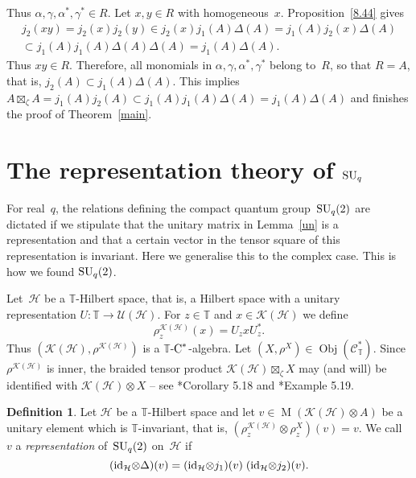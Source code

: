 \documentclass[a4paper]{amsart}
\numberwithin{equation}{section}
\theoremstyle{definition}
\newtheorem{Def}[Thm]{Definition}
\theoremstyle{remark}
\begin{document}
Thus $\alpha,\gamma,\alpha^{*},\gamma^{*}\in R$.  Let $x,y\in R$ with
homogeneous~\(x\).  Proposition~\ref{8.44} gives
\begin{multline*}
  j_{2}(xy)
  = j_{2}(x)j_{2}(y)\in j_{2}(x)j_{1}({{A}})\Delta({{A}})
  = j_{1}({{A}}) j_{2}(x) \Delta({{A}})
  \\ \subset j_{1}({{A}}) j_{1}({{A}}) \Delta({{A}})
  \Delta({{A}})
  = j_{1}({{A}})\Delta({{A}}).
\end{multline*}
Thus $xy\in R$.  Therefore, all monomials in
$\alpha,\gamma,\alpha^{*},\gamma^{*}$ belong to~$R$, so that
$R={{A}}$, that is, $j_{2}({{A}})\subset j_{1}({{A}})
\Delta({{A}})$.  This implies ${{A}}{\boxtimes}_\zeta {{A}} =
j_{1}({{A}}) j_{2}({{A}}) \subset j_{1}({{A}})
j_{1}({{A}}) \Delta({{A}}) = j_{1}({{A}}) \Delta({{A}})$
and finishes the proof of Theorem~\ref{main}.

\section{The representation theory of
  \texorpdfstring{${\textup{SU}}_{q}$}{SUq(2)}}

For real~\(q\), the relations defining the compact quantum
group~\({\textup{SU}}_q(2)\) are dictated if we stipulate that the unitary
matrix in Lemma~\ref{un} is a representation and that a certain vector
in the tensor square of this representation is invariant.  Here we
generalise this to the complex case.  This is how we found ${\textup{SU}}_q(2)$.

Let~$\mathcal{H}$ be a $\mathbb{T}${\nobreakdash}-Hilbert space, that is, a
Hilbert space with a unitary representation $U\colon
\mathbb{T}\rightarrow\mathcal{U}(\mathcal{H})$.  For $z\in\mathbb{T}$
and $x\in\mathcal{K}(\mathcal{H})$ we define
\[
\rho^{\mathcal{K}(\mathcal{H})}_z(x) = U_z xU_z^*.
\]
Thus $(\mathcal{K}(\mathcal{H}),\rho^{\mathcal{K}(\mathcal{H})})$ is a
\(\mathbb{T}\){\nobreakdash}-\({\textup{C}^*}\)-algebra.  Let
$(X,\rho^X)\in\operatorname{\mathrm{Obj}}(\mathcal{C}^*_{\mathbb{T}})$.  Since
$\rho^{\mathcal{K}(\mathcal{H})}$ is inner, the braided tensor product
$\mathcal{K}(\mathcal{H}){\boxtimes}_\zeta X$ may (and will) be identified
with $\mathcal{K}(\mathcal{H})\otimes X$ -- see
\cite{Meyer-Roy-Woronowicz:Twisted_tensor}*{Corollary 5.18} and
\cite{Meyer-Roy-Woronowicz:Twisted_tensor}*{Example 5.19}.

\begin{Def}
  \label{fd}
  Let $\mathcal{H}$ be a $\mathbb{T}${\nobreakdash}-Hilbert space and let $v\in
  {\operatorname{M}}(\mathcal{K}(\mathcal{H}){\otimes} {{A}})$ be a unitary element
  which is $\mathbb{T}$-invariant, that is,
  \((\rho^{\mathcal{K}(\mathcal{H})}_z\otimes\rho^X_z)(v) = v\).  We
  call~$v$ a \emph{representation} of~${\textup{SU}}_{q}(2)$ on~$\mathcal{H}$ if
  \[
  ({\textup{id}}_{\mathcal{H}}{\otimes}\Delta)(v)
  = ({\textup{id}}_{\mathcal{H}}{\otimes} j_{1})(v)\;
  ({\textup{id}}_{\mathcal{H}}{\otimes} j_{2})(v).
  \]
\end{Def}
\end{document}
